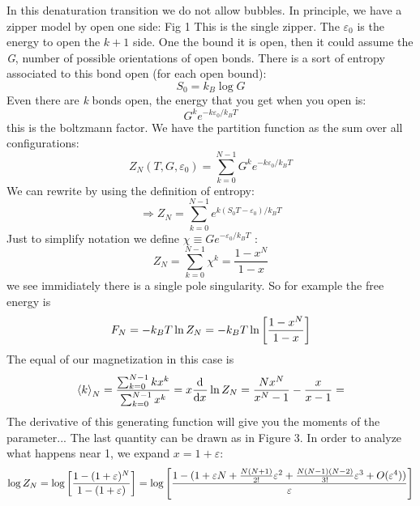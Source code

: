 \documentclass[../main/main.tex]{subfiles}
\begin{document}

In this denaturation transition we do not allow bubbles. In principle, we have a zipper model by open one side:
Fig 1
This is the single zipper.
The \( \varepsilon _0 \) is the energy to open the \( k+1 \) side.
One the bound it is open, then it could assume the \emph{G}, number of possible orientations of open bonds. There is a sort of entropy associated to this bond open (for each open bound):
 \begin{equation}
   S_0 = k_B \log{G}
 \end{equation}
Even there are \emph{k} bonds open, the energy that you get when you open is:
\begin{equation}
  G^k e^{-k \varepsilon _0/k_B T}
\end{equation}
this is the boltzmann factor. We have the partition function as the sum over all configurations:
\begin{equation}
  Z_N (T,G, \varepsilon _0) = \sum_{k=0}^{N-1}  G^k e^{-k \varepsilon _0/k_B T}
\end{equation}
We can rewrite by using the definition of entropy:
\begin{equation}
  \Rightarrow Z_N = \sum_{k=0}^{N-1} e^{k(S_0 T - \varepsilon _0)/k_B T}
\end{equation}
Just to simplify notation we define \( \chi \equiv G e^{-\varepsilon _0/k_B T}  \) :
\begin{equation}
  Z_N = \sum_{k=0}^{N-1} \chi ^k = \frac{1-x^N}{1-x}
\end{equation}
we see immidiately there is a single pole singularity.
So for example the free energy is
\begin{equation}
  F_N = -k_B T \ln{Z_N} = -k_B T \ln{\qty[\frac{1-x^N}{1-x}]}
\end{equation}
The equal of our magnetization in this case is
\begin{equation}
  \expval{k}_N = \frac{\sum_{k=0}^{N-1} k x^k}{\sum_{k=0}^{N-1} x^k } = x \dv[]{}{x} \ln{Z_N}  = \frac{N x^N}{x^N-1} - \frac{x}{x-1}=
\end{equation}
The derivative of this generating function will give you the moments of the parameter...
The last quantity can be drawn as in Figure 3. In order to analyze what happens near 1, we expand \( x=1+\varepsilon  \):
\begin{equation}
  \log{Z_N} = \log{\qty[\frac{1-(1+\varepsilon )^N}{1-(1+\varepsilon )}] } =
  \log{\qty[\frac{1-(1+\varepsilon N  + \frac{N(N+1)}{2!}\varepsilon ^2 + \frac{N(N-1)(N-2)}{3!}\varepsilon ^3 +O(\varepsilon ^4))}{\varepsilon }] }
\end{equation}
\end{document}
